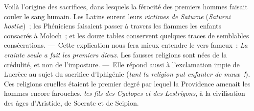 \documentclass[french,twoside]{book} %
\begin{document}
Voilà l’origine des sacrifices, dans lesquels la férocité des premiers hommes faisait couler le sang humain. Les Latins eurent leurs {\itshape victimes de Saturne} ({\itshape Saturni hostiæ}) ; les Phéniciens faisaient passer à travers les flammes les enfants consacrés à Moloch ; et les douze tables conservent quelques traces de  semblables consécrations. — Cette explication nous fera mieux entendre le vers fameux : \emph{{\itshape La crainte seule a fait les premiers dieux.}} Les fausses religions sont nées de la crédulité, et non de l’imposture. — Elle répond aussi à l’exclamation impie de Lucrèce au sujet du sacrifice d’Iphigénie (\emph{{\itshape tant la religion put enfanter de maux} !}). Ces religions cruelles étaient le premier degré par lequel la Providence amenait les hommes encore farouches, {\itshape les fils des Cyclopes et des Lestrigons}, à la civilisation des âges d’Aristide, de Socrate et de Scipion.
\end{document}
